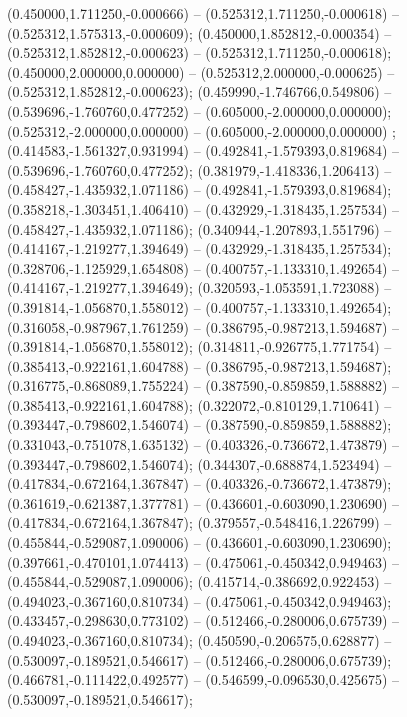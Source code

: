  (0.450000,1.711250,-0.000666) -- (0.525312,1.711250,-0.000618) -- (0.525312,1.575313,-0.000609);
 (0.450000,1.852812,-0.000354) -- (0.525312,1.852812,-0.000623) -- (0.525312,1.711250,-0.000618);
 (0.450000,2.000000,0.000000) -- (0.525312,2.000000,-0.000625) -- (0.525312,1.852812,-0.000623);
 (0.459990,-1.746766,0.549806) -- (0.539696,-1.760760,0.477252) -- (0.605000,-2.000000,0.000000);
 (0.525312,-2.000000,0.000000) -- (0.605000,-2.000000,0.000000) ;
 (0.414583,-1.561327,0.931994) -- (0.492841,-1.579393,0.819684) -- (0.539696,-1.760760,0.477252);
 (0.381979,-1.418336,1.206413) -- (0.458427,-1.435932,1.071186) -- (0.492841,-1.579393,0.819684);
 (0.358218,-1.303451,1.406410) -- (0.432929,-1.318435,1.257534) -- (0.458427,-1.435932,1.071186);
 (0.340944,-1.207893,1.551796) -- (0.414167,-1.219277,1.394649) -- (0.432929,-1.318435,1.257534);
 (0.328706,-1.125929,1.654808) -- (0.400757,-1.133310,1.492654) -- (0.414167,-1.219277,1.394649);
 (0.320593,-1.053591,1.723088) -- (0.391814,-1.056870,1.558012) -- (0.400757,-1.133310,1.492654);
 (0.316058,-0.987967,1.761259) -- (0.386795,-0.987213,1.594687) -- (0.391814,-1.056870,1.558012);
 (0.314811,-0.926775,1.771754) -- (0.385413,-0.922161,1.604788) -- (0.386795,-0.987213,1.594687);
 (0.316775,-0.868089,1.755224) -- (0.387590,-0.859859,1.588882) -- (0.385413,-0.922161,1.604788);
 (0.322072,-0.810129,1.710641) -- (0.393447,-0.798602,1.546074) -- (0.387590,-0.859859,1.588882);
 (0.331043,-0.751078,1.635132) -- (0.403326,-0.736672,1.473879) -- (0.393447,-0.798602,1.546074);
 (0.344307,-0.688874,1.523494) -- (0.417834,-0.672164,1.367847) -- (0.403326,-0.736672,1.473879);
 (0.361619,-0.621387,1.377781) -- (0.436601,-0.603090,1.230690) -- (0.417834,-0.672164,1.367847);
 (0.379557,-0.548416,1.226799) -- (0.455844,-0.529087,1.090006) -- (0.436601,-0.603090,1.230690);
 (0.397661,-0.470101,1.074413) -- (0.475061,-0.450342,0.949463) -- (0.455844,-0.529087,1.090006);
 (0.415714,-0.386692,0.922453) -- (0.494023,-0.367160,0.810734) -- (0.475061,-0.450342,0.949463);
 (0.433457,-0.298630,0.773102) -- (0.512466,-0.280006,0.675739) -- (0.494023,-0.367160,0.810734);
 (0.450590,-0.206575,0.628877) -- (0.530097,-0.189521,0.546617) -- (0.512466,-0.280006,0.675739);
 (0.466781,-0.111422,0.492577) -- (0.546599,-0.096530,0.425675) -- (0.530097,-0.189521,0.546617);
